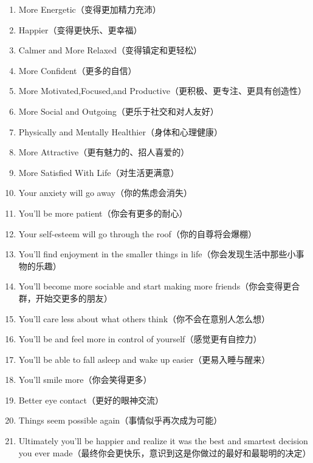 \begin{enumerate}
    \item More Energetic（变得更加精力充沛）
    \item Happier（变得更快乐、更幸福）
    \item Calmer and More Relaxed（变得镇定和更轻松）
    \item More Confident（更多的自信）
    \item More Motivated,Focused,and Productive（更积极、更专注、更具有创造性）
    \item More Social and Outgoing（更乐于社交和对人友好）
    \item Physically and Mentally Healthier（身体和心理健康）
    \item More Attractive（更有魅力的、招人喜爱的）
    \item More Satisfied With Life（对生活更满意）
    \item Your anxiety will go away（你的焦虑会消失）
    \item You'll be more patient（你会有更多的耐心）
    \item Your self-esteem will go through the roof（你的自尊将会爆棚）
    \item You'll find enjoyment in the smaller things in life（你会发现生活中那些小事物的乐趣）
    \item You'll become more sociable and start making more friends（你会变得更合群，开始交更多的朋友）
    \item You'll care less about what others think（你不会在意别人怎么想）
    \item You'll be and feel more in control of yourself（感觉更有自控力）
    \item You'll be able to fall asleep and wake up easier（更易入睡与醒来）
    \item You'll smile more（你会笑得更多）
    \item Better eye contact（更好的眼神交流）
    \item Things seem possible again（事情似乎再次成为可能）
    \item Ultimately you'll be happier and realize it was the best and smartest decision you ever made（最终你会更快乐，意识到这是你做过的最好和最聪明的决定）
\end{enumerate}

